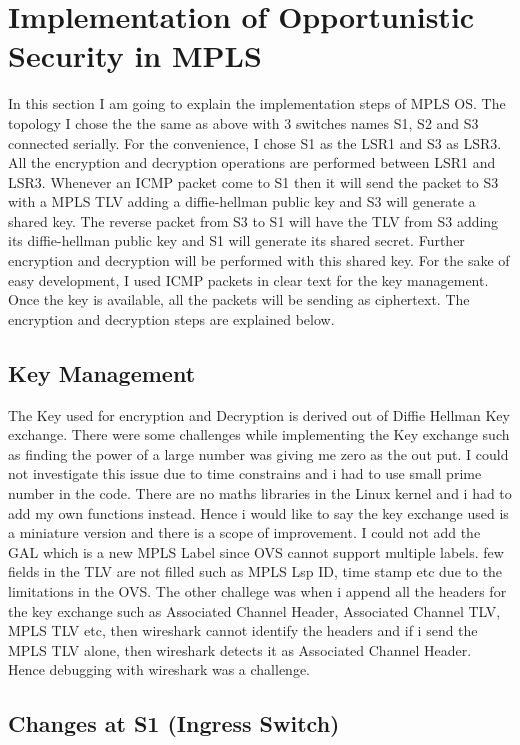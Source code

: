 \section{Implementation of Opportunistic Security in MPLS}


In this section I am going to explain the implementation steps of MPLS OS. The topology I chose the the same as above with 3 switches names S1, S2 and S3 connected serially. For the convenience, I chose S1 as the LSR1 and S3 as LSR3. All the encryption and decryption operations are performed between LSR1 and LSR3. Whenever an ICMP packet come to S1 then it will send the packet to S3 with a MPLS TLV adding a diffie-hellman public key and S3 will generate a shared key. The reverse packet from S3 to S1 will have the TLV from S3 adding its diffie-hellman public key and S1 will generate its shared secret. Further encryption and decryption will be performed with this shared key. For the sake of easy development, I used ICMP packets in clear text for the key management. Once the key is available, all the packets will be sending as ciphertext. The encryption and decryption steps are explained below.  

\subsection{Key Management}

The Key used for encryption and Decryption is derived out of Diffie Hellman Key exchange. There were some challenges while implementing the Key exchange such as finding the power of a large number was giving me zero as the out put. I could not investigate this issue due to time constrains and i had to use small prime number in the code. There are no maths libraries in the Linux kernel and i had to add my own functions instead. Hence i would like to say the key exchange used is a miniature version and there is a scope of improvement. I could not add the GAL which is a new MPLS Label since OVS cannot support multiple labels. few fields in the TLV are not filled such as MPLS Lsp ID, time stamp etc due to the limitations in the OVS. The other challege was when i append all the headers for the key exchange such as Associated Channel Header, Associated Channel TLV, MPLS TLV etc, then wireshark cannot identify the headers and if i send the MPLS TLV alone, then wireshark detects it as Associated Channel Header. Hence debugging with wireshark was a challenge.


\subsection{Changes at S1 (Ingress Switch)}


